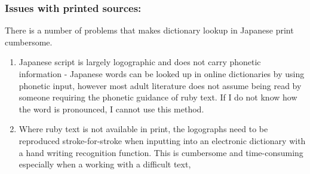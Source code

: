 \documentclass{article}
\begin{document}
\subsubsection{Issues with printed sources:}
There is a number of problems that makes dictionary lookup in Japanese print cumbersome.
\begin{enumerate}
    \item Japanese script is largely logographic and does not carry phonetic information - Japanese words can be looked up in online dictionaries by using phonetic input, however most adult literature does not assume being read by someone requiring the phonetic guidance of ruby text. If I do not know how the word is pronounced, I cannot use this method. 
    \item Where ruby text is not available in print, the logographs need to be reproduced stroke-for-stroke when inputting into an electronic dictionary with a hand writing recognition function. This is cumbersome and time-consuming especially when a working with a difficult text,

\end{enumerate}
\end{document}
